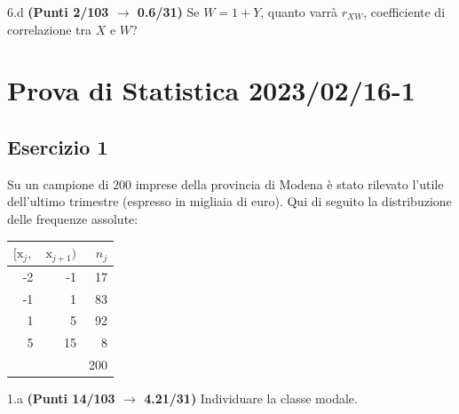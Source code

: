 \documentclass[
  11pt,
]{book}
\theoremstyle{mytheoremstyle}
\theoremstyle{mydefstyle}
\begin{document}
6.d \textbf{(Punti 2/103 \(\rightarrow\) 0.6/31)} Se \(W=1+ Y\), quanto varrà \(r_{XW}\), coefficiente di correlazione tra \(X\) e \(W\)?

\section{Prova di Statistica 2023/02/16-1}\label{prova-di-statistica-20230216-1}

\subsection{Esercizio 1}\label{esercizio-1-22}

Su un campione di \(200\) imprese della provincia di Modena è stato rilevato l'utile dell'ultimo trimestre (espresso in migliaia di euro). Qui di seguito la distribuzione delle frequenze assolute:

\begin{table}[H]
\centering
\begin{tabular}{rrr}
\toprule
$[\text{x}_j,$ & $\text{x}_{j+1})$ & $n_j$\\
\midrule
-2 & -1 & 17\\
-1 & 1 & 83\\
1 & 5 & 92\\
5 & 15 & 8\\
 &  & 200\\
\bottomrule
\end{tabular}
\end{table}

1.a \textbf{(Punti 14/103 \(\rightarrow\) 4.21/31)} Individuare la classe modale.
\end{document}
